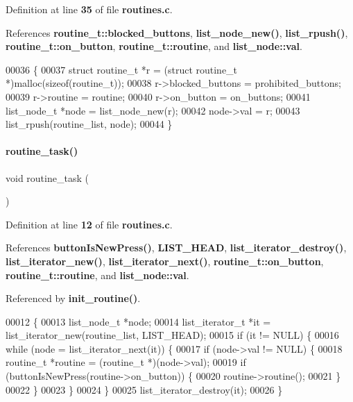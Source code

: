 Definition at line \textbf{ 35} of file \textbf{ routines.\+c}.



References \textbf{ routine\+\_\+t\+::blocked\+\_\+buttons}, \textbf{ list\+\_\+node\+\_\+new()}, \textbf{ list\+\_\+rpush()}, \textbf{ routine\+\_\+t\+::on\+\_\+button}, \textbf{ routine\+\_\+t\+::routine}, and \textbf{ list\+\_\+node\+::val}.


\begin{DoxyCode}
00036                                                     \{
00037   \textcolor{keyword}{struct }routine_t *r = (\textcolor{keyword}{struct }routine_t *)malloc(\textcolor{keyword}{sizeof}(routine_t));
00038   r->blocked_buttons = prohibited\_buttons;
00039   r->routine = routine;
00040   r->on_button = on\_buttons;
00041   list_node_t *node = list_node_new(r);
00042   node->val = r;
00043   list_rpush(routine_list, node);
00044 \}
\end{DoxyCode}
\mbox{\label{a00140_a230cdcefb410a429fb6baba1f88fc9ba}} 
\paragraph{routine\+\_\+task()}
{\footnotesize\ttfamily void routine\+\_\+task (\begin{DoxyParamCaption}{ }\end{DoxyParamCaption})}



Definition at line \textbf{ 12} of file \textbf{ routines.\+c}.



References \textbf{ button\+Is\+New\+Press()}, \textbf{ L\+I\+S\+T\+\_\+\+H\+E\+AD}, \textbf{ list\+\_\+iterator\+\_\+destroy()}, \textbf{ list\+\_\+iterator\+\_\+new()}, \textbf{ list\+\_\+iterator\+\_\+next()}, \textbf{ routine\+\_\+t\+::on\+\_\+button}, \textbf{ routine\+\_\+t\+::routine}, and \textbf{ list\+\_\+node\+::val}.



Referenced by \textbf{ init\+\_\+routine()}.


\begin{DoxyCode}
00012                     \{
00013   list_node_t *node;
00014   list_iterator_t *it = list_iterator_new(routine_list, LIST_HEAD);
00015   \textcolor{keywordflow}{if} (it != NULL) \{
00016     \textcolor{keywordflow}{while} (node = list_iterator_next(it)) \{
00017       \textcolor{keywordflow}{if} (node->val != NULL) \{
00018         routine_t *routine = (routine_t *)(node->val);
00019         \textcolor{keywordflow}{if} (buttonIsNewPress(routine->on_button)) \{
00020           routine->routine();
00021         \}
00022       \}
00023     \}
00024   \}
00025   list_iterator_destroy(it);
00026 \}
\end{DoxyCode}


